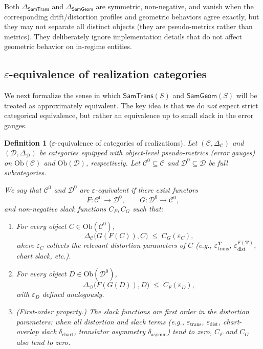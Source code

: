 \documentclass[11pt]{article}
\newtheorem{definition}{Definition}
\newcommand{\SamTrans}{\mathsf{SamTrans}}
\newcommand{\SamGeom}{\mathsf{SamGeom}}
\begin{document}
Both $\Delta_{\SamTrans}$ and $\Delta_{\SamGeom}$ are symmetric, non-negative, and vanish when
the corresponding drift/distortion profiles and geometric behaviors agree exactly, but they may not
separate all distinct objects (they are pseudo-metrics rather than metrics). They deliberately
ignore implementation details that do not affect geometric behavior on in-regime entities.

\subsection{$\varepsilon$-equivalence of realization categories}
\label{subsec:epsilon-equivalence}

We next formalize the sense in which $\SamTrans(S)$ and $\SamGeom(S)$ will be treated as
approximately equivalent. The key idea is that we do \emph{not} expect strict categorical
equivalence, but rather an equivalence up to small slack in the error gauges.

\begin{definition}[$\varepsilon$-equivalence of categories of realizations]
\label{def:epsilon-equivalence}
Let $(\mathcal{C}, \Delta_{\mathcal{C}})$ and $(\mathcal{D}, \Delta_{\mathcal{D}})$ be categories equipped
with object-level pseudo-metrics (error gauges) on $\mathrm{Ob}(\mathcal{C})$ and
$\mathrm{Ob}(\mathcal{D})$, respectively. Let $\mathcal{C}^0 \subseteq \mathcal{C}$ and
$\mathcal{D}^0 \subseteq \mathcal{D}$ be full subcategories.

We say that $\mathcal{C}^0$ and $\mathcal{D}^0$ are \emph{$\varepsilon$-equivalent} if there exist
functors
\[
F : \mathcal{C}^0 \to \mathcal{D}^0,
\qquad
G : \mathcal{D}^0 \to \mathcal{C}^0,
\]
and non-negative slack functions $C_F, C_G$ such that:
\begin{enumerate}[]
\item For every object $C \in \mathrm{Ob}(\mathcal{C}^0)$,
\[
\Delta_{\mathcal{C}}\bigl(G(F(C)), C\bigr)
\;\le\;
C_G(\varepsilon_C),
\]
where $\varepsilon_C$ collects the relevant distortion parameters of $C$ (e.g.,
$\varepsilon_{\mathrm{trans}}^{\mathbf{T}}$, $\varepsilon_{\mathrm{dist}}^{F(\mathbf{T})}$, chart slack, etc.).
\item For every object $D \in \mathrm{Ob}(\mathcal{D}^0)$,
\[
\Delta_{\mathcal{D}}\bigl(F(G(D)), D\bigr)
\;\le\;
C_F(\varepsilon_D),
\]
with $\varepsilon_D$ defined analogously.
\item (\emph{First-order property.}) The slack functions are \emph{first order} in the distortion
parameters: when all distortion and slack terms (e.g., $\varepsilon_{\mathrm{trans}}$,
$\varepsilon_{\mathrm{dist}}$, chart-overlap slack $\delta_{\mathrm{chart}}$, translator asymmetry
$\delta_{\mathrm{asymm}}$) tend to zero, $C_F$ and $C_G$ also tend to zero.
\end{enumerate}
\end{definition}
\end{document}
